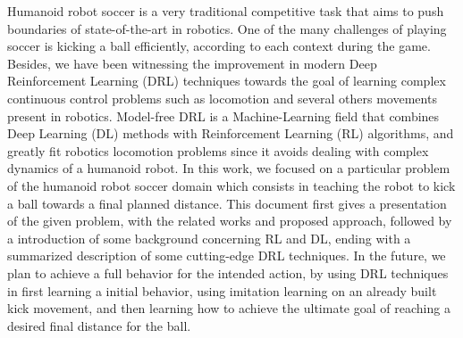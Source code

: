 
Humanoid robot soccer is a very traditional competitive task that aims to push boundaries of state-of-the-art in robotics. One of the many challenges of playing soccer is kicking a ball efficiently, according to each context during the game. Besides, we have been witnessing the improvement in modern Deep Reinforcement Learning (DRL) techniques towards the goal of learning complex continuous control problems such as locomotion and several others movements present in robotics. Model-free DRL is a Machine-Learning field that combines Deep Learning (DL) methods with Reinforcement Learning (RL) algorithms, and greatly fit robotics locomotion problems since it avoids dealing with complex dynamics of a humanoid robot. In this work, we focused on a particular problem of the humanoid robot soccer domain which consists in teaching the robot to kick a ball towards a final planned distance. This document first gives a presentation of the given problem, with the related works and proposed approach, followed by a introduction of some background concerning RL and DL, ending with a summarized description of some cutting-edge DRL techniques. In the future, we plan to achieve a full behavior for the intended action, by using DRL techniques in first learning a initial behavior, using imitation learning on an already built kick movement, and then learning how to achieve the ultimate goal of reaching a desired final distance for the ball.